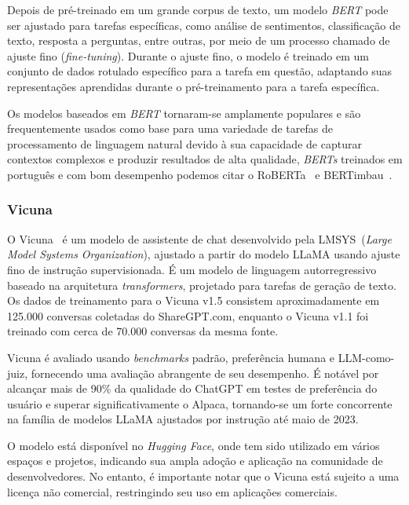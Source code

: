 Depois de pré-treinado em um grande corpus de texto, um modelo \textit{BERT} pode ser ajustado para tarefas específicas, como análise de sentimentos, classificação de texto, resposta a perguntas, entre outras, por meio de um processo chamado de ajuste fino (\textit{fine-tuning}). Durante o ajuste fino, o modelo é treinado em um conjunto de dados rotulado específico para a tarefa em questão, adaptando suas representações aprendidas durante o pré-treinamento para a tarefa específica.

Os modelos baseados em \textit{BERT} tornaram-se amplamente populares e são frequentemente usados como base para uma variedade de tarefas de processamento de linguagem natural devido à sua capacidade de capturar contextos complexos e produzir resultados de alta qualidade, \textit{BERTs} treinados em português e com bom desempenho podemos citar o RoBERTa~\cite{liu2019roberta} e BERTimbau~\cite{souza2020bertimbau}.

\subsubsection{Vicuna}
\label{cap:fund_teorica:sec:modelos:subsec:vicuna}

O Vicuna~\cite{vicuna2023} é um modelo de assistente de chat desenvolvido pela LMSYS~(\textit{Large Model Systems Organization}), ajustado a partir do modelo LLaMA usando ajuste fino de instrução supervisionada. É um modelo de linguagem autorregressivo baseado na arquitetura \textit{transformers}, projetado para tarefas de geração de texto. Os dados de treinamento para o Vicuna v1.5 consistem aproximadamente em 125.000 conversas coletadas do ShareGPT.com, enquanto o Vicuna v1.1 foi treinado com cerca de 70.000 conversas da mesma fonte.

Vicuna é avaliado usando \textit{benchmarks} padrão, preferência humana e LLM-como-juiz, fornecendo uma avaliação abrangente de seu desempenho. É notável por alcançar mais de 90\% da qualidade do ChatGPT em testes de preferência do usuário e superar significativamente o Alpaca, tornando-se um forte concorrente na família de modelos LLaMA ajustados por instrução até maio de 2023.

O modelo está disponível no \textit{Hugging Face}, onde tem sido utilizado em vários espaços e projetos, indicando sua ampla adoção e aplicação na comunidade de desenvolvedores. No entanto, é importante notar que o Vicuna está sujeito a uma licença não comercial, restringindo seu uso em aplicações comerciais.

